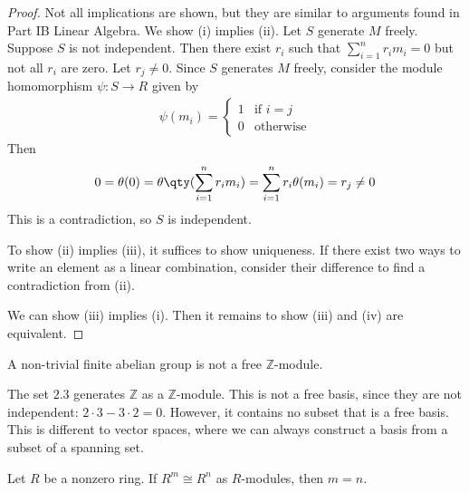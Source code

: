 \begin{proof}
	Not all implications are shown, but they are similar to arguments found in Part IB Linear Algebra.
	We show (i) implies (ii).
	Let $S$ generate $M$ freely.
	Suppose $S$ is not independent.
	Then there exist $r_i$ such that $\sum_{i=1}^n r_i m_i = 0$ but not all $r_i$ are zero.
	Let $r_j \neq 0$.
	Since $S$ generates $M$ freely, consider the module homomorphism $\psi : S \to R$ given by
	\begin{align*}
		\psi(m_i) = \begin{cases}
			1 & \text{if } i = j \\
			0 & \text{otherwise}
		\end{cases}
	\end{align*}
	Then
	\begin{align*}
		0 = \theta(0) = \theta\qty(\sum_{i=1}^n r_i m_i) = \sum_{i=1}^n r_i \theta(m_i) = r_j \neq 0
	\end{align*}
	This is a contradiction, so $S$ is independent.

	To show (ii) implies (iii), it suffices to show uniqueness.
	If there exist two ways to write an element as a linear combination, consider their difference to find a contradiction from (ii).

	We can show (iii) implies (i).
	Then it remains to show (iii) and (iv) are equivalent.
\end{proof}
\begin{example}
	A non-trivial finite abelian group is not a free $\mathbb Z$-module.

	The set $\qty{2,3}$ generates $\mathbb Z$ as a $\mathbb Z$-module.
	This is not a free basis, since they are not independent: $2 \cdot 3 - 3 \cdot 2 = 0$.
	However, it contains no subset that is a free basis.
	This is different to vector spaces, where we can always construct a basis from a subset of a spanning set.
\end{example}
\begin{proposition}
	Let $R$ be a nonzero ring.
	If $R^m \cong R^n$ as $R$-modules, then $m = n$.
\end{proposition}
